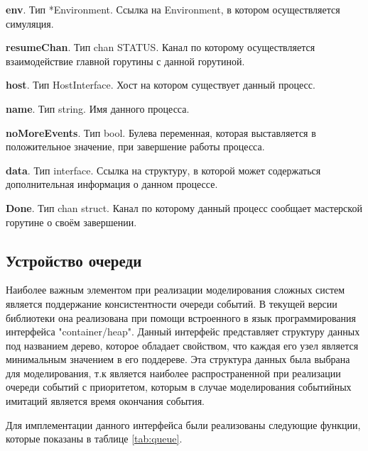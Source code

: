 \textbf{	env}. Тип        *Environment. Ссылка на Environment, в котором осуществляется симуляция. 

\textbf{	resumeChan}. Тип chan STATUS. Канал по которому осуществляется взаимодействие главной горутины с данной горутиной. 

\textbf{	host}. Тип       HostInterface. Хост на котором существует данный процесс. 

\textbf{	name}. Тип         string. Имя данного процесса. 

\textbf{	noMoreEvents}. Тип bool. Булева переменная, которая выставляется в положительное значение, при завершение работы процесса.

\textbf{	data}. Тип         interface. Ссылка на  структуру, в  которой может содержаться дополнительная информация о данном процессе.

\textbf{	Done}. Тип chan struct. Канал по которому данный процесс сообщает мастерской горутине о своём завершении. 



\subsection{Устройство очереди}

Наиболее важным элементом при реализации моделирования сложных систем является поддержание консистентности очереди событий. В текущей версии библиотеки она реализована при помощи встроенного в язык программирования интерфейса "container/heap". Данный интерфейс представляет структуру данных под названием дерево, которое обладает свойством, что каждая его узел является минимальным значением в его поддереве. Эта структура данных была выбрана для моделирования, т.к является наиболее распространенной при реализации очереди событий с приоритетом, которым в случае моделирования событийных имитаций является время окончания события. 

Для имплементации данного интерфейса были реализованы следующие функции, которые показаны в таблице \ref{tab:queue}. 

